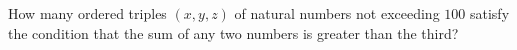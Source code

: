 How many ordered triples $(x,y,z)$ of natural numbers not exceeding $100$ satisfy the condition that the sum of any two numbers is greater than the third?
